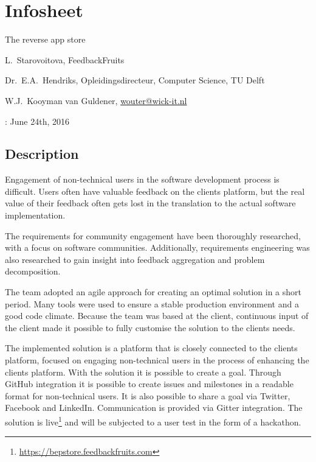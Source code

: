 \chapter{Infosheet}
\begin{description}[nosep]
    \item[Title of the project:] The reverse app store
    \item[Client:] L.\ Starovoitova, FeedbackFruits
    \item[Coach:] Dr.\ E.A.\ Hendriks, Opleidingsdirecteur, Computer Science, TU Delft
    \item[Contact person:] W.J.\ Kooyman van Guldener, \url{wouter@wick-it.nl}
    \item[Final presentation date]: June 24th, 2016
\end{description}

\section{Description}
Engagement of non-technical users in the software development process is difficult. Users often have valuable feedback on the clients platform, but the real value of their feedback often gets lost in the translation to the actual software implementation. 

The requirements for community engagement have been thoroughly researched, with a focus on software communities. Additionally, requirements engineering was also researched to gain insight into feedback aggregation and problem decomposition.

The team adopted an agile approach for creating an optimal solution in a short period. Many tools were used to ensure a stable production environment and a good code climate. Because the team was based at the client, continuous input of the client made it possible to fully customise the solution to the clients needs.

The implemented solution is a platform that is closely connected to the clients platform, focused on engaging non-technical users in the process of enhancing the clients platform. With the solution it is possible to create a goal. Through GitHub integration it is possible to create issues and milestones in a readable format for non-technical users. It is also possible to share a goal via Twitter, Facebook and LinkedIn. Communication is provided via Gitter integration. The solution is live\footnote{\url{https://bepstore.feedbackfruits.com}} and will be subjected to a user test in the form of a hackathon.

